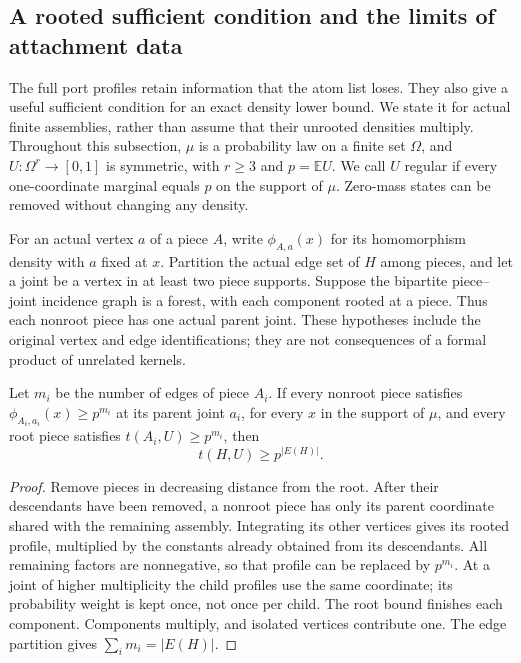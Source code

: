 
\subsection{A rooted sufficient condition and the limits of attachment data}

The full port profiles retain information that the atom list loses.
They also give a useful sufficient condition for an exact density lower
bound.  We state it for actual finite assemblies, rather than assume
that their unrooted densities multiply.  Throughout this subsection,
$\mu$ is a probability law on a finite set $\Omega$, and $U:\Omega^r\to[0,1]$
is symmetric, with $r\ge3$ and $p=\mathbb EU$.  We call $U$ regular if
every one-coordinate marginal equals $p$ on the support of $\mu$.
Zero-mass states can be removed without changing any density.

For an actual vertex $a$ of a piece $A$, write $\phi_{A,a}(x)$ for
its homomorphism density with $a$ fixed at $x$.  Partition the actual
edge set of $H$ among pieces, and let a joint be a vertex in at least
two piece supports.  Suppose the bipartite piece--joint incidence
graph is a forest, with each component rooted at a piece.  Thus each
nonroot piece has one actual parent joint.  These hypotheses include
the original vertex and edge identifications; they are not consequences
of a formal product of unrelated kernels.

\begin{lemma}
\label{followon-root-safe-forest}
Let $m_i$ be the number of edges of piece $A_i$.  If every nonroot
piece satisfies $\phi_{A_i,a_i}(x)\ge p^{m_i}$ at its parent joint
$a_i$, for every $x$ in the support of $\mu$, and every root piece
satisfies $t(A_i,U)\ge p^{m_i}$, then
\[
 t(H,U)\ge p^{|E(H)|}.
\]
\end{lemma}
\begin{proof}
Remove pieces in decreasing distance from the root.  After their
descendants have been removed, a nonroot piece has only its parent
coordinate shared with the remaining assembly.  Integrating its other
vertices gives its rooted profile, multiplied by the constants already
obtained from its descendants.  All remaining factors are nonnegative,
so that profile can be replaced by $p^{m_i}$.  At a joint of higher
multiplicity the child profiles use the same coordinate; its probability
weight is kept once, not once per child.  The root bound finishes each
component.  Components multiply, and isolated vertices contribute one.
The edge partition gives $\sum_i m_i=|E(H)|$.
\end{proof}

